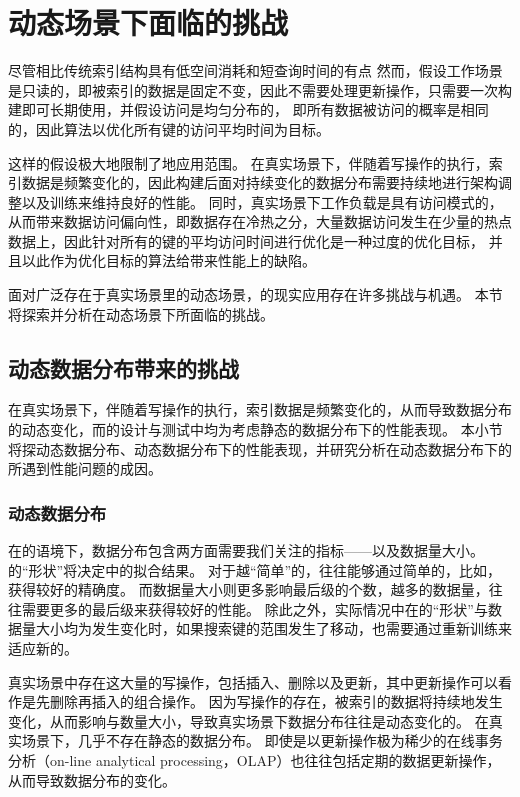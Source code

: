 \chapter{动态场景下{\li}面临的挑战}
\label{chap:challenge}

尽管{\li}相比传统索引结构具有低空间消耗和短查询时间的有点
然而，{\li}假设工作场景是只读的，即被索引的数据是固定不变，因此不需要处理更新操作，{\li}只需要一次构建即可长期使用，并假设访问是均匀分布的，
即所有数据被访问的概率是相同的，因此{\li}算法以优化所有键的访问平均时间为目标。

这样的假设极大地限制了{\li}地应用范围。
在真实场景下，伴随着写操作的执行，索引数据是频繁变化的，因此{\li}构建后面对持续变化的数据分布需要持续地进行架构调整以及训练来维持良好的{\li}性能。
同时，真实场景下工作负载是具有访问模式的，从而带来数据访问偏向性，即数据存在冷热之分，大量数据访问发生在少量的热点数据上，因此针对所有的键的平均访问时间进行优化是一种过度的优化目标，
并且以此作为优化目标的算法给{\li}带来性能上的缺陷。

面对广泛存在于真实场景里的动态场景，{\li}的现实应用存在许多挑战与机遇。
本节将探索并分析{\li}在动态场景下所面临的挑战。

\section{动态数据分布带来的挑战}
\label{sec:dist-challenge}

在真实场景下，伴随着写操作的执行，索引数据是频繁变化的，从而导致数据分布的动态变化，而{\li}的设计与测试中均为考虑静态的数据分布下的性能表现。
本小节将探动态数据分布、动态数据分布下{\li}的性能表现，并研究分析{\li}在动态数据分布下的所遇到性能问题的成因。

\subsection{动态数据分布}

在{\li}的语境下，数据分布包含两方面需要我们关注的指标{------}{\cdf}以及数据量大小。
{\cdf}的``形状''将决定{\rmi}中{\model}的拟合结果。
对于越``简单''的{\cdf}，{\rmi}往往能够通过简单的{\model}，比如{\lr}，获得较好的精确度。
而数据量大小则更多影响{\rmi}最后级{\model}的个数，越多的数据量，往往需要更多的{\rmi}最后级{\model}来获得较好的性能。
除此之外，实际情况中在{\cdf}的``形状''与数据量大小均为发生变化时，如果搜索键的范围发生了移动，{\li}也需要通过重新训练来适应新的{\cdf}。

真实场景中存在这大量的写操作，包括插入、删除以及更新，其中更新操作可以看作是先删除再插入的组合操作。
因为写操作的存在，被索引的数据将持续地发生变化，从而影响{\cdf}与数量大小，导致真实场景下数据分布往往是动态变化的。
在真实场景下，几乎不存在静态的数据分布。
即使是以更新操作极为稀少的在线事务分析（on-line analytical processing，OLAP）也往往包括定期的数据更新操作，从而导致数据分布的变化。

